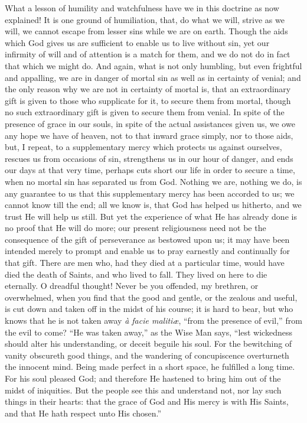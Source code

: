 What a lesson of humility and watchfulness have we in this doctrine
as now explained! It is one ground of humiliation, that, do what we
will, strive as we will, we cannot escape from lesser sins while we
are on earth. Though the aids which God gives us are sufficient to
enable us to live without sin, yet our infirmity of will and of
attention is a match for them, and we do not do in fact that which we
might do. And again, what is not only humbling, but even frightful and
appalling, we are in danger of mortal sin as well as in certainty of
venial; and the only reason why we are not in certainty of mortal is,
that an extraordinary gift is given to those who supplicate for it, to
secure them from mortal, though no such extraordinary gift is given to
secure them from venial. In spite of the presence of grace in our
souls, in spite of the actual assistances given us, we owe any hope we
have of heaven, not to that inward grace simply, nor to those aids,
but, I repeat, to a supplementary mercy which protects us against
ourselves, rescues us from occasions of sin, strengthens us in our
hour of danger, and ends our days at that very time, perhaps cuts
short our life in order to secure a time, when no mortal sin has
separated us from God. Nothing we are, nothing we do, is any guarantee
to us that this supplementary mercy has been accorded to us; we cannot
know till the end; all we know is, that God has helped us hitherto,
and we trust He will help us still. But yet the experience of what He
has already done is no proof that He will do more; our present
religiousness need not be the consequence of the gift of perseverance
as bestowed upon us; it may have been intended merely to prompt and
enable us to pray earnestly and continually for that gift. There are
men who, had they died at a particular time, would have died the death
of Saints, and who lived to fall. They lived on here to die eternally.
O dreadful thought! Never be you offended, my brethren, or
overwhelmed, when you find that the good and gentle, or the zealous
and useful, is cut down and taken off in the midst of his course; it
is hard to bear, but who knows that he is not taken away \emph{à facie
malitiæ}, ``from the presence of evil,'' from the evil to
come? ``He was taken away,'' as the Wise Man says, ``lest
wickedness should alter his understanding, or deceit beguile his soul.
For the bewitching of vanity obscureth good things, and the wandering
of concupiscence overturneth the innocent mind. Being made perfect in
a short space, he fulfilled a long time. For his soul pleased God; and
therefore He hastened to bring him out of the midst of iniquities. But
the people see this and understand not, nor lay such things in their
hearts: that the grace of God and His mercy is with His Saints, and
that He hath respect unto His chosen.''

